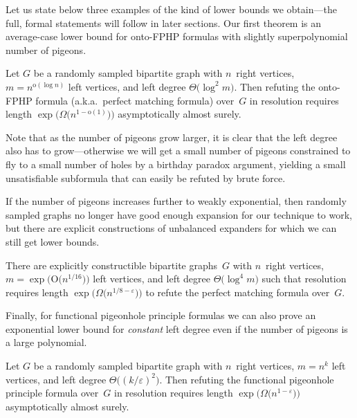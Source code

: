 \documentclass{theoretics}
\newcommand{\Bigoh}[1]{\mathrm{O} \bigl( #1 \bigr)}
\newcommand{\littleoh}[1]{\mathrm{o} ( #1 )}
\newcommand{\Bigtheta}[1]{\Theta \bigl( #1 \bigr)}
\newcommand{\Bigomega}[1]{\Omega \bigl( #1 \bigr)}
\newcommand{\exponentalpha}{\varepsilon}
\numberwithin{equation}{section}
\begin{document}
Let us state below three examples of the kind of lower bounds we
obtain---the full, formal statements will follow in later sections.
Our first theorem is an average-case lower bound for 
onto-FPHP formulas with slightly superpolynomial number of pigeons.

\begin{theorem}[Informal]
  \label{th:informal-quasipoly-npigeons}  
  Let
  $G$ be a randomly sampled bipartite graph with
  $n$~right vertices, \mbox{$m = n^{\littleoh{\log n}}$} left vertices, and left
  degree
  $\Bigtheta{\log^2 m}$.
  Then refuting
  the onto-FPHP formula (a.k.a.~perfect matching formula) over~$G$
  in resolution
  requires length
  $\exp \bigl( \Bigomega{n^{1-\littleoh{1}}} \bigr)$ 
  asymptotically almost surely.
\end{theorem}


Note that as the number of pigeons grow larger, it is clear that
the left degree also has to grow---otherwise we will get a small
number of pigeons constrained to fly to a small number of holes by a
birthday paradox argument, 
yielding
a small unsatisfiable
subformula that can easily be refuted by brute force.

If the number of pigeons increases further to weakly exponential, then
randomly sampled graphs no longer have good enough expansion for our
technique to work, but there are explicit constructions of unbalanced
expanders for which we can still get lower bounds.

\begin{theorem}[Informal]
  \label{th:informal-exponential-npigeons}
  There are explicitly constructible bipartite graphs~$G$ with
  $n$~right vertices, \mbox{$m = \exp \bigl( \Bigoh{n^{1/16}} \bigr)$}
  left vertices, and left degree $\Bigtheta{\log^4 m}$ such that
  resolution requires length
  $\exp \bigl( \Bigomega{n^{1/8 - \exponentalpha}} \bigr)$ to refute
  the perfect matching formula over~$G$.
\end{theorem}


Finally, for functional pigeonhole principle formulas we can also
prove an exponential lower bound for \emph{constant} left degree even if the
number of pigeons is a large polynomial.


\begin{theorem}[Informal]
  \label{th:informal-poly-npigeons}
  Let
  $G$ be a randomly sampled bipartite graph with
  $n$~right vertices, \mbox{$m = n^{k}$} left vertices, and left
  degree
  $\Bigtheta{(k / \varepsilon)^2}$.
  Then refuting the functional pigeonhole principle formula
  over~$G$
  in resolution
  requires length
  $\exp \bigl( \Bigomega{n^{1-\varepsilon}} \bigr)$ 
  asymptotically almost surely.
   \end{theorem}
\end{document}
